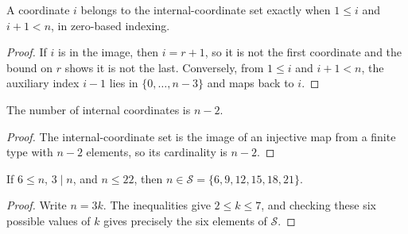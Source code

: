 \begin{lemma}

  \label{lem:mem_internal_indices}
  A coordinate \(i\) belongs to the internal-coordinate set exactly when
  \(1\leq i\) and \(i+1<n\), in zero-based indexing.
\end{lemma}
\begin{proof}

\leanok
  If \(i\) is in the image, then \(i=r+1\), so it is not the first coordinate
  and the bound on \(r\) shows it is not the last.  Conversely, from
  \(1\leq i\) and \(i+1<n\), the auxiliary index \(i-1\) lies in
  \(\{0,\ldots,n-3\}\) and maps back to \(i\).
\end{proof}

\begin{lemma}

  \label{lem:card_internal_indices}
  The number of internal coordinates is \(n-2\).
\end{lemma}
\begin{proof}

\leanok
  The internal-coordinate set is the image of an injective map from a finite
  type with \(n-2\) elements, so its cardinality is \(n-2\).
\end{proof}

\begin{lemma}

  \label{lem:small_sizes_mem_of_admissible_le_22}
  If \(6\leq n\), \(3\mid n\), and \(n\leq22\), then
  \(n\in\mathcal S=\{6,9,12,15,18,21\}\).
\end{lemma}
\begin{proof}

\leanok
  Write \(n=3k\).  The inequalities give \(2\leq k\leq7\), and checking these
  six possible values of \(k\) gives precisely the six elements of
  \(\mathcal S\).
\end{proof}

